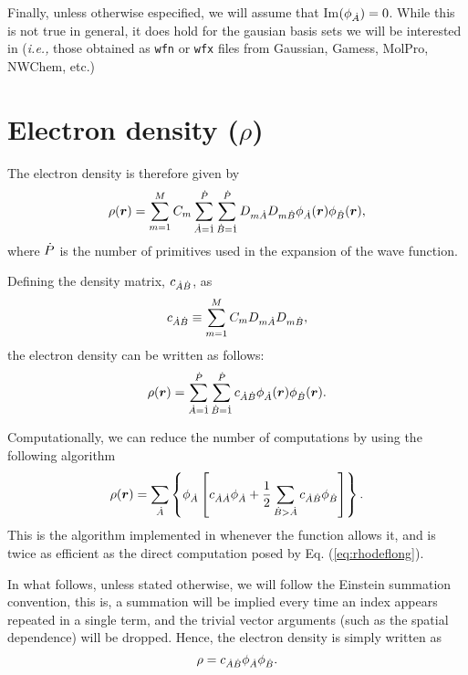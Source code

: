 Finally, unless otherwise especified, we will assume that Im$(\phi_{\dot{A}})=0$. While this is not true in general, it does hold for the gausian basis sets we will be interested in (\textit{i.e.,} those obtained as \texttt{wfn} or \texttt{wfx} files from Gaussian, Gamess, MolPro, NWChem, etc.)

\section{Electron density ($\rho$)}

The electron density is therefore given by
%
\begin{equation}
   \rho(\boldsymbol{r})=\sum_{m=1}^{M}C_m\sum_{\dot{A}=\dot{1}}^{\dot{P}}\sum_{\dot{B}=\dot{1}}^{\dot{P}}D_{m\dot{A}}D_{m\dot{B}}
                        \phi_{\dot{A}}(\boldsymbol{r})\phi_{\dot{B}}(\boldsymbol{r}),
\end{equation}
%
where $\dot{P}$ is the number of primitives used in the expansion of the wave function.

Defining the density matrix, $c_{\dot{A}\dot{B}}$, as
%
\begin{equation}
   c_{\dot{A}\dot{B}}\equiv\sum_{m=1}^{M}C_mD_{m\dot{A}}D_{m\dot{B}},
\end{equation}
%
the electron density can be written as follows:
%
\begin{equation}\label{eq:rhodeflong}
   \rho(\boldsymbol{r})=\sum_{\dot{A}=\dot{1}}^{\dot{P}}\sum_{\dot{B}=\dot{1}}^{\dot{P}}
      c_{\dot{A}\dot{B}}\phi_{\dot{A}}(\boldsymbol{r})\phi_{\dot{B}}(\boldsymbol{r}).
\end{equation}
%

Computationally, we can reduce the number of computations by using the following algorithm
%
\begin{equation}
   \rho(\boldsymbol{r})=\sum_{\dot{A}}\left\{\phi_{\dot{A}}\left[c_{\dot{A}\dot{A}}\phi_{\dot{A}}+\frac{1}{2}\sum_{\dot{B}>\dot{A}}c_{\dot{A}\dot{B}}\phi_{\dot{B}}\right]\right\}.
\end{equation}
%
This is the algorithm implemented in \DTK{} whenever the function allows it, and is twice as efficient as the direct computation posed by Eq. (\ref{eq:rhodeflong}).

In what follows, unless stated otherwise, we will follow the Einstein summation convention, this is, a summation will be implied every time an index appears repeated in a single term, and the trivial vector arguments (such as the spatial dependence) will be dropped. Hence, the electron density is simply written as
%
\begin{equation}
   \rho=c_{\dot{A}\dot{B}}\phi_{\dot{A}}\phi_{\dot{B}}.
\end{equation}
%

